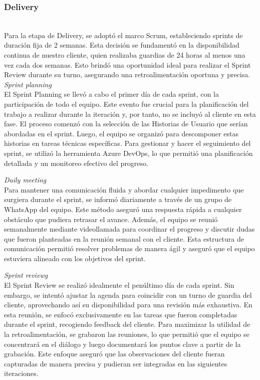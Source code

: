\subsubsection{Delivery} \\
Para la etapa de Delivery, se adoptó el marco Scrum, estableciendo sprints de duración fija de 2 semanas. Esta decisión se fundamentó en la disponibilidad continua de nuestro cliente, 
quien realizaba guardias de 24 horas al menos una vez cada dos semanas. Esto brindó una oportunidad ideal para realizar el Sprint Review durante su turno, asegurando una retroalimentación 
oportuna y precisa.\\

\textit{Sprint planning}\\
El Sprint Planning se llevó a cabo el primer día de cada sprint, con la participación de todo el equipo. Este evento fue crucial para la planificación del trabajo a realizar durante la 
iteración y, por tanto, no se incluyó al cliente en esta fase. El proceso comenzó con la selección de las Historias de Usuario que serían abordadas en el sprint. Luego, el equipo se organizó 
para descomponer estas historias en tareas técnicas específicas. Para gestionar y hacer el seguimiento del sprint, se utilizó la herramienta Azure DevOps, lo que permitió una planificación detallada 
y un monitoreo efectivo del progreso.

\textit{Daily meeting}\\
Para mantener una comunicación fluida y abordar cualquier impedimento que surgiera durante el sprint, se informó diariamente a través de un grupo de WhatsApp del equipo. Este método aseguró una 
respuesta rápida a cualquier obstáculo que pudiera retrasar el avance. Además, el equipo se reunió semanalmente mediante videollamada para coordinar el progreso y discutir dudas que fueron planteadas 
en la reunión semanal con el cliente. Esta estructura de comunicación permitió resolver problemas de manera ágil y aseguró que el equipo estuviera alineado con los objetivos del sprint.

\textit{Sprint reviewg}\\
El Sprint Review se realizó idealmente el penúltimo día de cada sprint. Sin embargo, se intentó ajustar la agenda para coincidir con un turno de guardia del cliente, aprovechando así su disponibilidad 
para una revisión más exhaustiva. En esta reunión, se enfocó exclusivamente en las tareas que fueron completadas durante el sprint, recogiendo feedback del cliente. Para maximizar la utilidad de la 
retroalimentación, se grabaron las reuniones, lo que permitió que el equipo se concentrará en el diálogo y luego documentará los puntos clave a partir de la grabación. Este enfoque aseguró que las 
observaciones del cliente fueran capturadas de manera precisa y pudieran ser integradas en las siguientes iteraciones.

